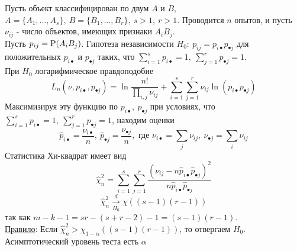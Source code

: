 \begin{example}
    Пусть объект классифицирован по двум $A$ и $B$,
    $A=\{A_1,\ldots,A_s\},\ B=\{B_1,\ldots,B_r\},\ s>1,\ r>1$.
    Проводится $n$ опытов, и пусть $\nu_{ij}$ - число объектов,
    имеющих признаки $A_iB_j$. \\
    Пусть $p_{ij}=\P(A_iB_j)$. Гипотеза независимости
    $H_0:\ p_{ij}=p_{i\bullet}p_{\bullet j}$ для положительных $p_{i\bullet}$ и $p_{\bullet j}$
    таких, что $\sum_{i=1}^sp_{i\bullet}=1,\ \sum_{j=1}^rp_{\bullet j}=1$. \\
    При $H_0$ логарифмическое правдоподобие
    \[L_n(\nu,p_{i\bullet},p_{\bullet j})=\ln\frac{n!}{\prod_{i,j}\nu_{ij}}+\sum_{i=1}^s\sum_{j=1}^r\nu_{ij}\ln(p_{i\bullet}p_{\bullet j})\]
    Максимизируя эту функцию по $p_{i\bullet},\ p_{\bullet j}$ при условиях, что $\sum_{i=1}^sp_{i\bullet}=1,\ \sum_{j=1}^rp_{\bullet j}=1$,
    находим оценки
    \[\widehat{p}_{i\bullet}=\frac{\nu_{i\bullet}}{n},\ \widehat{p}_{\bullet j}=\frac{\nu_{\bullet j}}{n},\text{ где } \nu_{i\bullet}=\sum_{j}\nu_{ij},\ \nu_{\bullet j}=\sum_{i}\nu_{ij}\]
    Статистика Хи-квадрат имеет вид
    \[\widehat{\chi}_n^2=\sum_{i=1}^s\sum_{j=1}^r\frac{(\nu_{ij}-n\widehat{p}_{i\bullet}\widehat{p}_{\bullet j})^2}{n\widehat{p}_{i\bullet}\widehat{p}_{\bullet j}}\]
    \[\widehat{\chi}_n^2\xrightarrow[H_0]{d}\chi((s-1)(r-1))\]
    так как $m-k-1=sr-(s+r-2)-1=(s-1)(r-1)$. \\
    \underline{Правило}: Если $\widehat{\chi}_n^2>\chi_{1-\alpha}((s-1)(r-1))$,
    то отвергаем $H_0$. Асимптотический уровень теста есть $\alpha$
\end{example}

